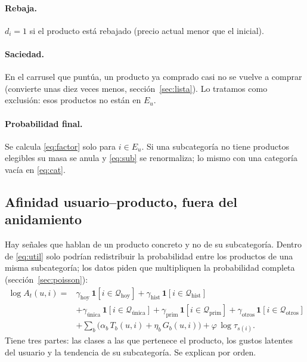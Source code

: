\documentclass[11pt,a4paper]{article}
\begin{document}
\paragraph{Rebaja.} $d_i=1$ si el producto está rebajado (precio actual menor que el inicial).

\paragraph{Saciedad.} En el carrusel que puntúa, un producto ya comprado casi no se vuelve a comprar
(convierte unas diez veces menos, sección~\ref{sec:lista}). Lo tratamos como exclusión: esos productos
no están en $E_u$.

\paragraph{Probabilidad final.} Se calcula \eqref{eq:factor} solo para $i\in E_u$. Si una subcategoría
no tiene productos elegibles su masa se anula y \eqref{eq:sub} se renormaliza; lo mismo con una
categoría vacía en \eqref{eq:cat}.

\subsection{Afinidad usuario--producto, fuera del anidamiento}\label{sec:afinidad}

Hay señales que hablan de un producto concreto y no de su subcategoría. Dentro de \eqref{eq:util} solo
podrían redistribuir la probabilidad entre los productos de una misma subcategoría; los datos piden que
multipliquen la probabilidad completa (sección~\ref{sec:poisson}):
\begin{equation}
\begin{aligned}
\log A_t(u,i)={}&\gamma_{\text{hoy}}\,\mathbf 1[i\in\mathcal Q_{\text{hoy}}]
+\gamma_{\text{hist}}\,\mathbf 1[i\in\mathcal Q_{\text{hist}}]\\
&+\gamma_{\text{única}}\,\mathbf 1[i\in\mathcal Q_{\text{única}}]
+\gamma_{\text{prim}}\,\mathbf 1[i\in\mathcal Q_{\text{prim}}]
+\gamma_{\text{otros}}\,\mathbf 1[i\in\mathcal Q_{\text{otros}}]\\
&+\sum_{b}\big(\alpha_b\,T_b(u,i)+\eta_b\,G_b(u,i)\big)+\varphi\,\log\tau_{s(i)} .
\end{aligned}\label{eq:afinidad}
\end{equation}
Tiene tres partes: las clases a las que pertenece el producto, los gustos latentes del usuario y la
tendencia de su subcategoría. Se explican por orden.
\end{document}
